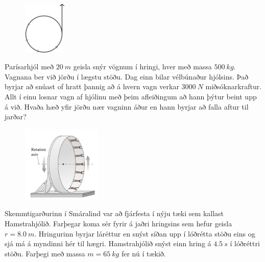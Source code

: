 \ifdefined \wholebook \else\documentclass[oneside]{book}\usepackage{EdlBook}\graphicspath{{figures/}}
\begin{document}
\begin{enumerate}[label = \textbf{Dæmi \thechapter.\arabic*.}]
\vspace{0.25cm}

\begin{minipage}{\linewidth}
\begin{figure}
\hspace{1.5cm}
\includegraphics[width=0.8in]{images/parisarhjol.png}
\end{figure}

\item Parísarhjól með $\SI{20}{m}$ geisla snýr vögnum í hringi, hver með massa $\SI{500}{kg}$. Vagnana ber við jörðu í lægstu stöðu. Dag einn bilar vélbúnaður hjólsins. Það byrjar að snúast of hratt þannig að á hvern vagn verkar $\SI{3000}{N}$ miðsóknarkraftur. Allt í einu losnar vagn af hjólinu með þeim afleiðingum að hann þýtur beint upp á við. Hvaða hæð yfir jörðu nær vagninn áður en hann byrjar að falla aftur til jarðar?

\end{minipage}

\newpage

\begin{minipage}{\linewidth}
\begin{figure}
\vspace{-1cm}
\includegraphics[width=1.5in]{images/hringhreyfing2.png}
\end{figure}

\item Skemmtigarðurinn í Smáralind var að fjárfesta í nýju tæki sem kallast Hamstrahjólið. Farþegar koma sér fyrir á jaðri hringsins sem hefur geisla $r = \SI{8.0}{m}$. Hringurinn byrjar láréttur en snýst síðan upp í lóðrétta stöðu eins og sjá má á myndinni hér til hægri. Hamstrahjólið snýst einn hring á $\SI{4.5}{s}$ í lóðréttri stöðu. Farþegi með massa $m = \SI{65}{kg}$ fer nú í tækið.


\end{minipage}
\end{enumerate}
\end{document}

